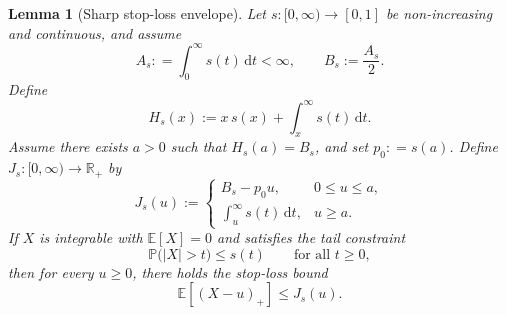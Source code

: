 \documentclass[11pt]{article}
\newcommand{\R}{\mathbb{R}}
\newcommand{\Pbb}{\mathbb{P}}
\newcommand{\Ebb}{\mathbb{E}}
\newtheorem{lemma}[theorem]{Lemma}
\begin{document}
\begin{lemma}[Sharp stop-loss envelope]\label{lem:envelope}
Let $s:[0,\infty)\to[0,1]$ be non-increasing and continuous, and assume
%
\[
A_s: = \int_0^\infty s(t)\, \mathrm{d}t < \infty,
\qquad
B_s := \frac{A_s}{2}.
\]
%
Define
%
\[
H_s(x) := x \, s(x) + \int_x^\infty s(t) \, \mathrm{d}t.
\]
%
Assume there exists $a>0$ such that $H_s(a) = B_s$, and set $p_0: = s(a)$. Define $J_s: [0, \infty) \to \R_+$ by
%
\[
J_s(u):=
\begin{cases}
B_s - p_0 u, & 0 \le u \le a,\\[2mm]
\int_u^\infty s(t) \, \mathrm{d}t, & u \ge a.
\end{cases}
\]
%
If $X$ is integrable with $\Ebb[X] = 0$ and satisfies the tail constraint
%
\[
\Pbb \bigl( |X| > t \bigr) \le s(t) \qquad \text{for all } t \ge 0,
\]
%
then for every $u \ge 0$, there holds the stop-loss bound
%
\[
\Ebb[ (X - u)_+ ] \le J_s (u).
\]
%
\end{lemma}
\end{document}
